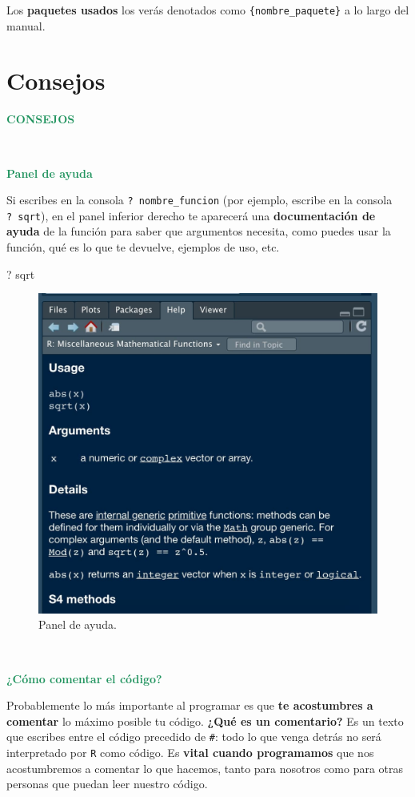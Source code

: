 \documentclass[11pt,]{book}
\newenvironment{Shaded}{\begin{snugshade}}{\end{snugshade}}
\newcommand{\NormalTok}[1]{#1}
\begin{document}
Los \textbf{paquetes usados} los verás denotados como \texttt{\{nombre\_paquete\}} a lo largo del manual.

\hypertarget{consejos-1}{%
\section{Consejos}\label{consejos-1}}

\textbf{\textcolor{#20935E}{CONSEJOS}}

~

\textbf{\textcolor{#20935E}{Panel de ayuda}}

Si escribes en la consola \texttt{?\ nombre\_funcion} (por ejemplo, escribe en la consola \texttt{?\ sqrt}), en el panel inferior derecho te aparecerá una \textbf{documentación de ayuda} de la función para saber que argumentos necesita, como puedes usar la función, qué es lo que te devuelve, ejemplos de uso, etc.

\begin{Shaded}
\begin{Highlighting}[]
\NormalTok{? sqrt}
\end{Highlighting}
\end{Shaded}

\begin{figure}

{\centering \includegraphics[width=0.5\linewidth]{./img/panel_ayuda} 

}

\caption{Panel de ayuda.}\label{fig:unnamed-chunk-15}
\end{figure}

~

\textbf{\textcolor{#20935E}{¿Cómo comentar el código?}}

Probablemente lo más importante al programar es que \textbf{te acostumbres a comentar} lo máximo posible tu código. \textbf{¿Qué es un comentario?} Es un texto que escribes entre el código precedido de \texttt{\#}: todo lo que venga detrás no será interpretado por \texttt{R} como código. Es \textbf{vital cuando programamos} que nos acostumbremos a comentar lo que hacemos, tanto para nosotros como para otras personas que puedan leer nuestro código.
\end{document}
